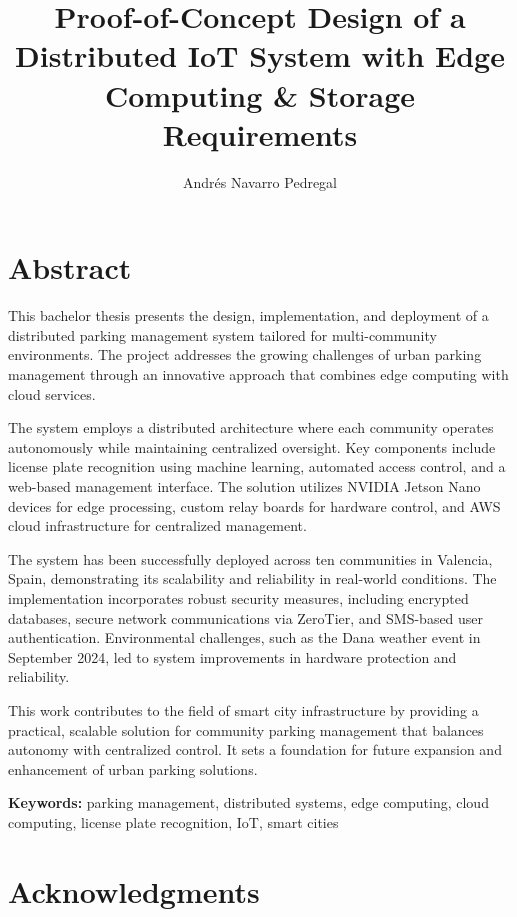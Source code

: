 \documentclass[oneside, 12pt, a4paper]{book}
\title{Proof-of-Concept Design of a Distributed IoT System with Edge Computing \& Storage Requirements}
\author{Andrés Navarro Pedregal}
\begin{document}

\frontmatter
\maketitle

\blankpage%
\chapter*{Abstract}

This bachelor thesis presents the design, implementation, and deployment of a distributed parking management system tailored for multi-community environments. The project addresses the growing challenges of urban parking management through an innovative approach that combines edge computing with cloud services.

The system employs a distributed architecture where each community operates autonomously while maintaining centralized oversight. Key components include license plate recognition using machine learning, automated access control, and a web-based management interface. The solution utilizes NVIDIA Jetson Nano devices for edge processing, custom relay boards for hardware control, and AWS cloud infrastructure for centralized management.

The system has been successfully deployed across ten communities in Valencia, Spain, demonstrating its scalability and reliability in real-world conditions. The implementation incorporates robust security measures, including encrypted databases, secure network communications via ZeroTier, and SMS-based user authentication. Environmental challenges, such as the Dana weather event in September 2024, led to system improvements in hardware protection and reliability.

This work contributes to the field of smart city infrastructure by providing a practical, scalable solution for community parking management that balances autonomy with centralized control. It sets a foundation for future expansion and enhancement of urban parking solutions.

\textbf{Keywords:} parking management, distributed systems, edge computing, cloud computing, license plate recognition, IoT, smart cities

\blankpage%

\chapter*{Acknowledgments}
\begingroup
\let\clearpage\relax %
\end{document}
